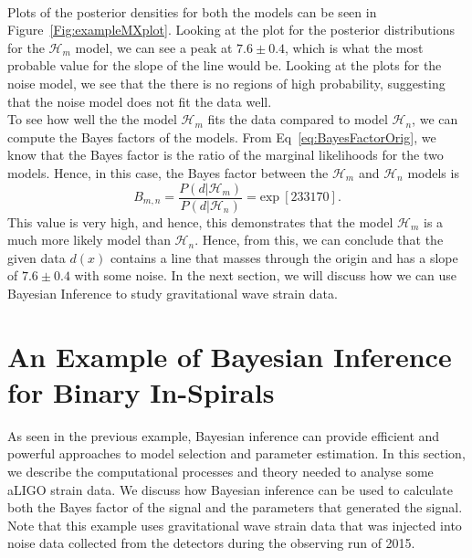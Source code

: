 \documentclass{article}
\begin{document}
  \noindent $\text{ }$\\
 
  Plots of the posterior densities for both the models can be seen in Figure~\ref{Fig:exampleMXplot}. Looking at the plot for the posterior distributions for the $\mathcal{H}_{m}$ model, we can see a peak at $7.6\pm 0.4$, which is what the most probable value for the slope of the line would be. Looking at the plots for the noise model, we see that the there is no regions of high probability, suggesting that the noise model does not fit the data well. \\
 

To see how well the the model $\mathcal{H}_{m}$ fits the data compared to model $\mathcal{H}_{n}$, we can compute the Bayes factors of the models. From Eq~\ref{eq:BayesFactorOrig}, we know that the Bayes factor is the ratio of the marginal likelihoods for the two models. Hence, in this case, the Bayes factor between the $\mathcal{H}_{m}$ and $\mathcal{H}_{n}$ models is $$B_{m,n} = \frac{P(d|\mathcal{H}_{m})}{P(d|\mathcal{H}_{n})} = \text{exp}\ [233170].$$ This value is very high, and hence, this demonstrates that the model $\mathcal{H}_{m}$ is a much more likely model than $\mathcal{H}_{n}$. Hence, from this, we can conclude that the given data $d(x)$ contains a line that masses through the origin and has a slope of $7.6\pm 0.4$ with some noise. In the next section, we will discuss how we can use Bayesian Inference to study gravitational wave strain data.\\
\newpage

 \section{An Example of Bayesian Inference for Binary In-Spirals}
 
 As seen in the previous example, Bayesian inference can provide efficient and powerful approaches to model selection and parameter estimation. In this section, we describe the computational processes and theory needed to analyse some aLIGO strain data. We discuss how Bayesian inference can be used to calculate both the Bayes factor of the signal and the parameters that generated the signal. Note that this example uses gravitational wave strain data that was injected into noise data collected from the detectors during the observing run of 2015.\\
 

\end{document}
